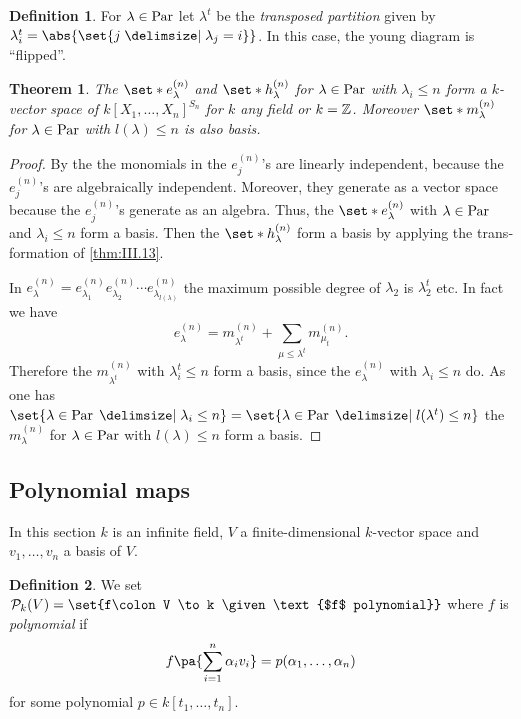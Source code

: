 \documentclass[12pt,a4paper]{scrartcl}
\theoremstyle{cplain}
\theoremstyle{cplain}
\newtheorem{thm}[thmcounter]{Theorem}
\theoremstyle{cplain}
\theoremstyle{definition}
\newtheorem*{deff}{Definition}
\begin{document}
\begin{otherlanguage}{english}

\begin{deff}
  For $\lambda\in\operatorname{Par}$ let $\lambda^t$ be the \emph{transposed partition} given by $\lambda_i^t = \abs{\set{j \given \lambda_j = i }}$. In this case, the young diagram is \enquote{flipped}. %
\end{deff}

\begin{thm}
  The $\set*{e_\lambda^{(n)}}$ and $\set*{h_\lambda^{(n)}}$ for $\lambda \in \operatorname{Par}$ with $\lambda_i \le n$ form a $k$-vector space of $k[X_1,\ldots,X_n]^{S_n}$ for $k$ any field or $k= \mathbb Z$. Moreover $\set*{m_\lambda^{(n)}}$ for $\lambda \in \operatorname{Par}$ with $l(\lambda) \le n$ is also basis.
\end{thm}
\begin{proof}
  By the  the monomials in the $e_j^{(n)}$'s are linearly independent, because the $e_j^{(n)}$'s are algebraically independent. Moreover, they generate as a vector space because the $e_j^{(n)}$'s generate as an algebra. Thus, the $\set*{e_\lambda^{(n)}}$ with $\lambda \in \operatorname{Par}$ and $\lambda_i \le n$ form a basis. Then the $\set*{h_\lambda^{(n)}}$ form a basis by applying the transformation of \cref{thm:III.13}.
  
  In $ e_\lambda^{(n)} = e_{\lambda_1}^{(n)}e_{\lambda_2}^{(n)}\cdots e_{\lambda_{l(\lambda)}}^{(n)} $ the maximum possible degree of $\lambda_2$ is $\lambda_2^t$ etc. In fact we have \[ e_\lambda^{(n)} = m_{\lambda^t}^{(n)} + \sum_{\mu \le \lambda^t} m_{\mu_t}^{(n)}. \] Therefore the $m_{\lambda^t}^{(n)}$ with $\lambda_i^t \le n$ form a basis, since the $e_\lambda^{(n)}$ with $\lambda_i \le n$ do. As one has $\set{\lambda \in \Par \given \lambda_i \le n} = \set{\lambda \in \Par \given l(\lambda^t) \le n}$ the $m_\lambda^{(n)}$ for $\lambda \in \operatorname{Par}$ with $l(\lambda) \le n$ form a basis.
\end{proof}

\subsection{Polynomial maps}
In this section $k$ is an infinite field, $V$ a finite-dimensional $k$-vector space and $v_1,\ldots,v_n$ a basis of $V$.

\begin{deff}
  We set $\Ps_k(V) = \set{f\colon V \to k \given \text{$f$ polynomial}}$ where $f$ is \emph{polynomial} if \[f\pa{\sum_{i=1}^n\alpha_iv_i} = p(\alpha_1,\ldots,\alpha_n)\] for some polynomial $p \in k[t_1,\ldots,t_n]$.
\end{deff}


\end{otherlanguage}
\end{document}
